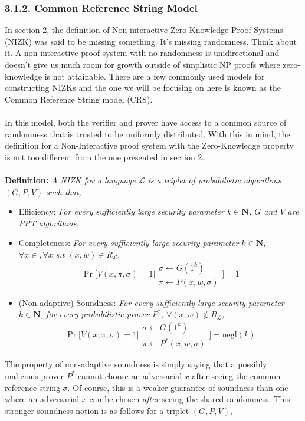 \documentclass{article}
\newcommand{\N}{{\mathbf N}}
\begin{document}
\subsubsection*{3.1.2. Common Reference String Model}
In section 2, the definition of Non-interactive Zero-Knowledge Proof Systems (NIZK) was said to be missing something. It's missing randomness. Think about it. A non-interactive proof system with no randomness is unidirectional and doesn't give us much room for growth outside of simplistic \textsc{NP} proofs where zero-knowledge is not attainable. There are a few commonly used models for constructing NIZKs and the one we will be focusing on here is known as the Common Reference String model (CRS). \\ \\
\noindent In this model, both the verifier and prover have access to a common source of randomness that is trusted to be uniformly distributed. With this in mind, the definition for a Non-Interactive proof system with the Zero-Knowledge property is not too different from the one presented in section 2. \\ \\
\noindent \textbf{Definition:} \textit{A NIZK for a language $\mathcal{L}$ is a triplet of probabilistic algorithms $(G, P, V)$ such that,}
\begin{itemize}
    \item Efficiency: \textit{For every sufficiently large security parameter $k \in \N$, $G$ and $V$ are \textsc{PPT} algorithms.}
    \item Completeness: \textit{For every sufficiently large security parameter $k \in \N$, $\forall{x} \in \mathcal, \forall x$ s.t  $(x, w) \in R_{\mathcal{L}}$},
    $$\Pr\bigg[V(x, \pi, \sigma) = 1 \bigg\vert \begin{array}{c}\sigma \leftarrow G(1^k) \\ \pi \leftarrow P(x, w, \sigma)\end{array}\bigg] = 1$$
    \item (Non-adaptive) Soundness: \textit{For every sufficiently large security parameter $k \in \N$, for every probabilistic prover $P^*$, $\forall{(x, w)} \not \in R_{\mathcal{L}}$,}
    $$\Pr\bigg[V(x, \pi, \sigma) = 1 \bigg\vert \begin{array}{c}\sigma \leftarrow G(1^k) \\ \pi \leftarrow P^*(x, w, \sigma)\end{array}\bigg] = \text{negl}(k)$$
\end{itemize}
The property of non-adaptive soundness is simply saying that a possibly malicious prover $P^*$ cannot choose an adversarial $x$ after seeing the common reference string $\sigma$. Of course, this is a weaker guarantee of soundness than one where an adversarial $x$ can be chosen \textit{after} seeing the shared randomness. This stronger soundness notion is as follows for a triplet $(G, P, V)$,
\end{document}
